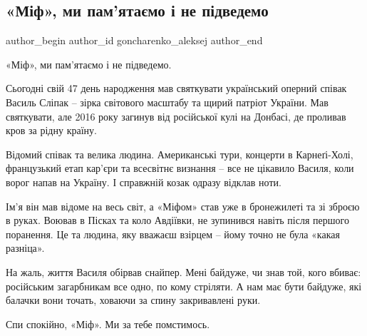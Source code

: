  
 
 
 
 
 
\subsection{«Міф», ми пам'ятаємо і не підведемо}
\label{sec:20_12_2021.fb.goncharenko_aleksej.1.slipak}
 
\ifcmt
 author_begin
   author_id goncharenko_aleksej
 author_end
\fi

«Міф», ми пам'ятаємо і не підведемо.

Сьогодні свій 47 день народження мав святкувати український оперний співак
Василь Сліпак – зірка світового масштабу та щирий патріот України. Мав
святкувати, але 2016 року загинув від російської кулі на Донбасі, де проливав
кров за рідну країну.


Відомий співак та велика людина. Американські тури, концерти в Карнеґі-Холі,
французький етап кар'єри та всесвітнє визнання – все не цікавило Василя, коли
ворог напав на Україну. І справжній козак одразу відклав ноти.

Ім'я він мав відоме на весь світ, а «Міфом» став уже в бронежилеті та зі зброєю
в руках. Воював в Пісках та коло Авдіївки, не зупинився навіть після першого
поранення. Це та людина, яку вважаєш взірцем – йому точно не була «какая
разніца».

На жаль, життя Василя обірвав снайпер. Мені байдуже, чи знав той, кого вбиває:
російським загарбникам все одно, по кому стріляти. А нам має бути байдуже, які
балачки вони точать, ховаючи за спину закривавлені руки.

Спи спокійно, «Міф». Ми за тебе помстимось.

